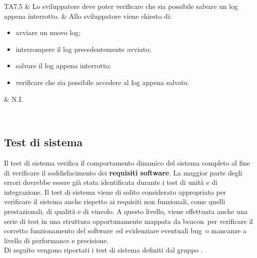 \documentclass[../PianoDiQualifica.tex]{subfiles}
\begin{document}
\begin{appendices}
\begin{longtabu}
	\midrule 
	TA7.5 & Lo sviluppatore deve poter verificare che sia possibile salvare un log appena interrotto. & Allo sviluppatore viene chiesto di: \begin{itemize} \item avviare un nuovo log; \item interrompere il log precedentemente avviato; \item salvare il log appena interrotto; \item verificare che sia possibile accedere al log appena salvato. \end{itemize} & N.I. \\ 
	\bottomrule
	\caption{Tabella test di accettazione} \\
\end{longtabu}
	
	\subsection{Test di sistema}
	Il test di sistema verifica il comportamento dinamico del sistema completo al fine di verificare il soddisfacimento dei \textbf{requisiti software}. La maggior parte degli errori dovrebbe essere già stata identificata durante i test di unità e di integrazione. Il test di sistema viene di solito considerato appropriato per verificare il sistema anche rispetto ai requisiti non funzionali, come quelli prestazionali, di qualità e di vincolo. A questo livello, viene effettuata anche una serie di test in una struttura opportunamente mappata da beacon\g\ per verificare il corretto funzionamento del software\g\ ed evidenziare eventuali bug\g\ o mancanze a livello di performance e precisione.\\
	Di seguito vengono riportati i test di sistema definiti dal gruppo \leaf.
	

\end{appendices}
\end{document}
